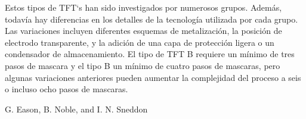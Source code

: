 \documentclass[conference]{IEEEtran}
\begin{document}
    Estos tipos de TFT`s han sido investigados por numerosos grupos. Además, todavía 
    hay diferencias en los detalles de la tecnología utilizada por cada grupo.
    Las variaciones incluyen diferentes esquemas de metalización, la posición de
    electrodo transparente, y la adición de una capa de protección ligera o un condensador
    de almacenamiento. El tipo de TFT B requiere un mínimo de tres
    pasos de mascara y el tipo B un mínimo de cuatro pasos de mascaras, pero
    algunas variaciones anteriores pueden aumentar la complejidad del proceso a
    seis o incluso ocho pasos de mascaras.










\begin{thebibliography}{00}
 G. Eason, B. Noble, and I. N. Sneddon

\end{thebibliography}
\end{document}
